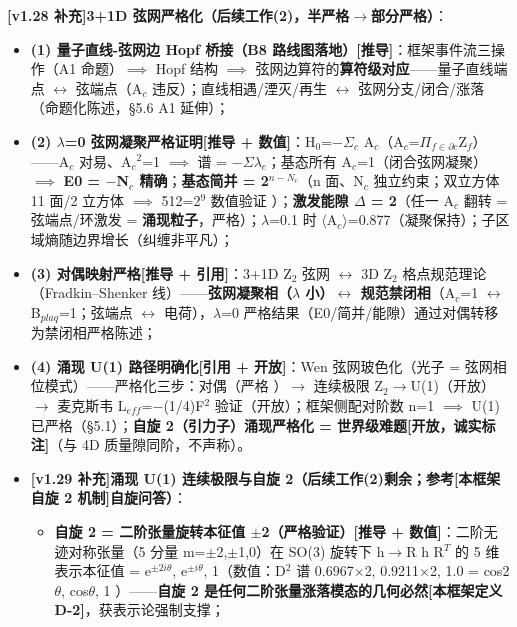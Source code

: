 \documentclass[UTF8,fontset=windows]{csoarticle}
\newcommand{\mtag}[1]{\textbf{[#1]}}
\newcommand{\up}[1]{\ensuremath{^{#1}}}
\newcommand{\down}[1]{\ensuremath{_{#1}}}
\begin{document}
\textbf{\mtag{v1.28 补充}3+1D 弦网严格化（后续工作(2)，半严格\ensuremath{\to}部分严格）}：
\begin{itemize}
\item \textbf{(1) 量子直线-弦网边 Hopf 桥接（B8 路线图落地）}\mtag{推导}：框架事件流三操作（A1 命题）\ensuremath{\implies} Hopf 结构 \ensuremath{\implies} 弦网边算符的\textbf{算符级对应}------量子直线端点 \ensuremath{\leftrightarrow} 弦端点（A\down{c} 违反）；直线相遇/湮灭/再生 \ensuremath{\leftrightarrow} 弦网分支/闭合/涨落（命题化陈述，\S{}5.6 A1 延伸）；
\item \textbf{(2) \ensuremath{\lambda}=0 弦网凝聚严格证明}\mtag{推导 + 数值}：H\down{0}=\ensuremath{-}\ensuremath{\Sigma}\down{c} A\down{c}（A\down{c}=\ensuremath{\Pi}\down{f\in{}\partial{}c}Z\down{f}）------A\down{c} 对易、A\down{c}\up{2}=1 \ensuremath{\implies} 谱 = \ensuremath{-}\ensuremath{\Sigma}\ensuremath{\lambda}\down{c}；基态所有 A\down{c}=1（闭合弦网凝聚）\ensuremath{\implies} \textbf{E0 = \ensuremath{-}N\down{c} 精确}；\textbf{基态简并 = 2\up{n-N\down{c}}}（n 面、N\down{c} 独立约束；双立方体 11 面/2 立方体 \ensuremath{\implies} 512=2\up{9} 数值验证 \checkmark）；\textbf{激发能隙 \ensuremath{\Delta} = 2}（任一 A\down{c} 翻转 = 弦端点/环激发 = \textbf{涌现粒子}，严格）；\ensuremath{\lambda}=0.1 时 \ensuremath{\langle}A\down{c}\ensuremath{\rangle}=0.877（凝聚保持）；子区域熵随边界增长（纠缠非平凡）；
\item \textbf{(3) 对偶映射严格}\mtag{推导 + 引用}：3+1D Z\down{2} 弦网 \ensuremath{\leftrightarrow} 3D Z\down{2} 格点规范理论（Fradkin--Shenker 线）------\textbf{弦网凝聚相（\ensuremath{\lambda} 小）\ensuremath{\leftrightarrow} 规范禁闭相}（A\down{c}=1 \ensuremath{\leftrightarrow} B\down{plaq}=1；弦端点 \ensuremath{\leftrightarrow} 电荷），\ensuremath{\lambda}=0 严格结果（E0/简并/能隙）通过对偶转移为禁闭相严格陈述；
\item \textbf{(4) 涌现 U(1) 路径明确化}\mtag{引用 + 开放}：Wen 弦网玻色化（光子 = 弦网相位模式）------严格化三步：对偶（严格 \checkmark）\ensuremath{\to} 连续极限 Z\down{2}\ensuremath{\to}U(1)（开放）\ensuremath{\to} 麦克斯韦 L\down{eff}=\ensuremath{-}(1/4)F\up{2} 验证（开放）；框架侧配对阶数 n=1 \ensuremath{\implies} U(1) 已严格（\S{}5.1）；\textbf{自旋 2（引力子）涌现严格化 = 世界级难题}\mtag{开放，诚实标注}（与 4D 质量隙同阶，不声称）。
\item \textbf{\mtag{v1.29 补充}涌现 U(1) 连续极限与自旋 2（后续工作(2)剩余；参考\mtag{本框架自旋 2 机制}自旋问答）}：
\begin{itemize}
\item \textbf{自旋 2 = 二阶张量旋转本征值 \ensuremath{\pm}2（严格验证）}\mtag{推导 + 数值}：二阶无迹对称张量（5 分量 m=\ensuremath{\pm}2,\ensuremath{\pm}1,0）在 SO(3) 旋转下 h\ensuremath{\to}R h R\up{T} 的 5 维表示本征值 = {e\up{\pm{}2i\theta{}}, e\up{\pm{}i\theta{}}, 1}（数值：D\up{2} 谱 {0.6967\ensuremath{\times}2, 0.9211\ensuremath{\times}2, 1.0} = {cos2\ensuremath{\theta}, cos\ensuremath{\theta}, 1} \checkmark）------\textbf{自旋 2 是任何二阶张量涨落模态的几何必然}\mtag{本框架定义 D-2}，获表示论强制支撑；

\end{itemize}
\end{itemize}
\end{document}
